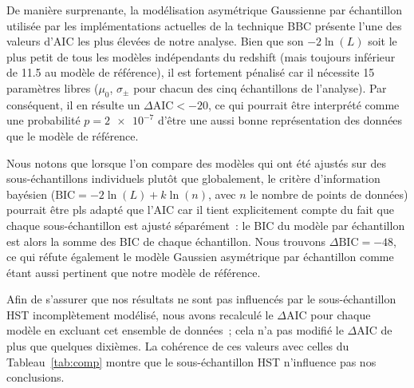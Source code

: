 \documentclass[../main/main.tex]{subfiles}
\begin{document}
De manière surprenante, la modélisation asymétrique Gaussienne par échantillon
utilisée par les implémentations actuelles de la technique BBC
\citep{scolnic2016, kessler2017} présente l'une des valeurs d'AIC les plus
élevées de notre analyse. Bien que son $-2\ln(L)$ soit le plus petit de tous les
modèles indépendants du redshift (mais toujours inférieur de \num{11.5} au
modèle de référence), il est fortement pénalisé car il nécessite 15 paramètres
libres ($\mu_0$, $\sigma_{\pm}$ pour chacun des cinq échantillons de l'analyse).
Par conséquent, il en résulte un $\Delta\mathrm{AIC} < -20$, ce qui pourrait
être interprété comme une probabilité $p = \num{2e-7}$ d'être une aussi bonne
représentation des données que le modèle de référence.

Nous notons que lorsque l'on compare des modèles qui ont été ajustés sur des
sous-échantillons individuels plutôt que globalement, le critère d'information
bayésien ($\mathrm{BIC} = -2\ln(L) + k\ln(n)$, avec $n$ le nombre de points de
données) pourrait être pls adapté que l'AIC car il tient explicitement compte du
fait que chaque sous-échantillon est ajusté séparément~: le BIC du modèle par
échantillon est alors la somme des BIC de chaque échantillon. Nous trouvons
$\Delta\mathrm{BIC} = -48$, ce qui réfute également le modèle Gaussien
asymétrique par échantillon comme étant aussi pertinent que notre modèle de
référence.

Afin de s'assurer que nos résultats ne sont pas influencés par le
sous-échantillon HST incomplètement modélisé, nous avons recalculé le
$\Delta$AIC pour chaque modèle en excluant cet ensemble de données~; cela n'a
pas modifié le $\Delta$AIC de plus que quelques dixièmes. La cohérence de ces
valeurs avec celles du Tableau~\ref{tab:comp} montre que le sous-échantillon HST
n'influence pas nos conclusions.
\end{document}
